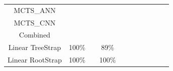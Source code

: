 \documentclass[a4paper,12pt,table]{article}
\begin{document}
\begin{table}[H]
{\begin{tabular}{|c|cccccccccc}
    MCTS\_ANN      & \multicolumn{1}{c|}{}                           & \multicolumn{1}{c|}{}                           & \multicolumn{1}{c|}{}                           & \cellcolor[HTML]{000000}{\color[HTML]{000000} } & \cellcolor[HTML]{000000}{\color[HTML]{000000} } & \cellcolor[HTML]{000000}{\color[HTML]{000000} } & \cellcolor[HTML]{000000}{\color[HTML]{000000} } & \cellcolor[HTML]{000000}{\color[HTML]{000000} } & \cellcolor[HTML]{000000}{\color[HTML]{000000} } & \cellcolor[HTML]{000000}{\color[HTML]{000000} } \\ \cline{1-5}
    MCTS\_CNN      & \multicolumn{1}{c|}{}                           & \multicolumn{1}{c|}{}                           & \multicolumn{1}{c|}{}                           & \multicolumn{1}{c|}{}                           & \cellcolor[HTML]{000000}                        & \cellcolor[HTML]{000000}                        & \cellcolor[HTML]{000000}                        & \cellcolor[HTML]{000000}                        & \cellcolor[HTML]{000000}                        & \cellcolor[HTML]{000000}                        \\ \cline{1-6}
    Combined       & \multicolumn{1}{c|}{}                           & \multicolumn{1}{c|}{}                           & \multicolumn{1}{c|}{}                           & \multicolumn{1}{c|}{}                           & \multicolumn{1}{c|}{}                           & \cellcolor[HTML]{000000}{\color[HTML]{000000} } & \cellcolor[HTML]{000000}{\color[HTML]{000000} } & \cellcolor[HTML]{000000}{\color[HTML]{000000} } & \cellcolor[HTML]{000000}{\color[HTML]{000000} } & \cellcolor[HTML]{000000}{\color[HTML]{000000} } \\ \cline{1-7}
    Linear TreeStrap & \multicolumn{1}{c|}{100\%}                    & \multicolumn{1}{c|}{}                           & \multicolumn{1}{c|}{89\%}                       & \multicolumn{1}{c|}{}                           & \multicolumn{1}{c|}{}                           & \multicolumn{1}{c|}{}                           & \cellcolor[HTML]{000000}                        & \cellcolor[HTML]{000000}                        & \cellcolor[HTML]{000000}                        & \cellcolor[HTML]{000000}                        \\ \cline{1-8}
    Linear RootStrap & \multicolumn{1}{c|}{100\%}                    & \multicolumn{1}{c|}{}                           & \multicolumn{1}{c|}{100\%}                      & \multicolumn{1}{c|}{}                           & \multicolumn{1}{c|}{}                           & \multicolumn{1}{c|}{}                           & \multicolumn{1}{c|}{}                           & \cellcolor[HTML]{000000}                        & \cellcolor[HTML]{000000}                        & \cellcolor[HTML]{000000}                        \\ \cline{1-9}

\end{tabular}}
\end{table}
\end{document}
